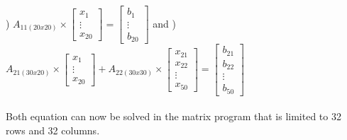 \documentclass{article}
\begin{document}
\\\\
) $A_{11(20x20)} \times \begin{bmatrix}x_1\\\vdots\\x_{20}\end{bmatrix} = \begin{bmatrix}b_1\\\vdots\\b_{20}\end{bmatrix}$
\indent\indent and \indent{}) $A_{21(30x20)} \times \begin{bmatrix}x_1\\\vdots\\x_{20}\end{bmatrix} + A_{22(30x30)} \times \begin{bmatrix}x_{21}\\x_{22}\\\vdots\\x_{50}\end{bmatrix} = \begin{bmatrix}b_{21}\\b_{22}\\\vdots\\b_{50}\end{bmatrix}$
\\\\
Both equation can now be solved in the matrix program that is limited to 32 rows and 32 columns.
\end{document}
